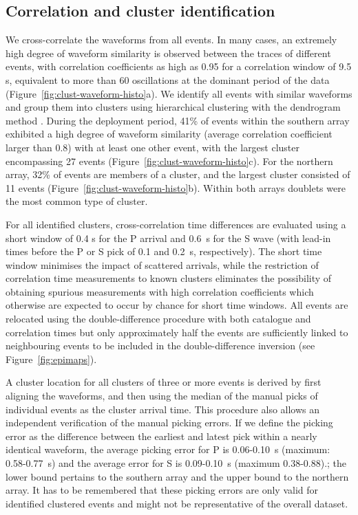 \documentclass[reviewcopy]{elsart}
\begin{document}
\subsection{Correlation and cluster identification}

We cross-correlate the waveforms from all events.  In many cases, an
extremely high degree of waveform similarity is observed between the traces of
different events, with correlation coefficients 
as high as 0.95 for a correlation window of 9.5 s, equivalent to more
than 60 oscillations at the dominant period of the data (Figure~\ref{fig:clust-waveform-histo}a).
We identify
all events with similar waveforms and group them into clusters using
hierarchical clustering with the dendrogram method \citep{hartigan75}.  During the deployment
period, 41\% of events within the southern array exhibited a high
degree of waveform similarity (average correlation coefficient larger
than 0.8) with at least one other event, with the
largest cluster encompassing 27 events (Figure~\ref{fig:clust-waveform-histo}c). For the northern array,  32\%
of events are members of a cluster, and the largest cluster consisted
of 11 events (Figure~\ref{fig:clust-waveform-histo}b).   Within 
both arrays doublets were the most common type of cluster.

For all identified clusters, cross-correlation time
differences are evaluated using a short window of 0.4 s for the P
arrival and 0.6~s for the S wave (with lead-in times before the P or S
pick of 0.1 and 0.2~s, respectively). The short time window minimises
the impact of scattered arrivals, while the restriction of correlation
time measurements to known clusters eliminates the possibility of
obtaining spurious measurements with high correlation coefficients
which otherwise are expected to occur by chance for short time windows.
All events are relocated using the double-difference procedure with
both catalogue and correlation times but only approximately half the
events are sufficiently linked to neighbouring events to be included
in the double-difference inversion (see Figure~\ref{fig:epimaps}).

A cluster location for all clusters of three or more events is derived
by first aligning the waveforms, and then using the median of the
manual picks of individual events as the cluster arrival time.  This
procedure also allows an independent verification of the manual
picking errors.  If we define the picking error as the difference
between the earliest and latest pick within a nearly identical
waveform, the average picking error for P is 0.06-0.10~s (maximum: 0.58-0.77~s)
and the average error for S is 0.09-0.10~s (maximum 0.38-0.88).; the
lower bound pertains to the southern array and the upper bound to the
northern array.  
 It has to be remembered that these picking errors are only valid for
 identified clustered events and might not be representative of the
 overall dataset. 
\end{document}
